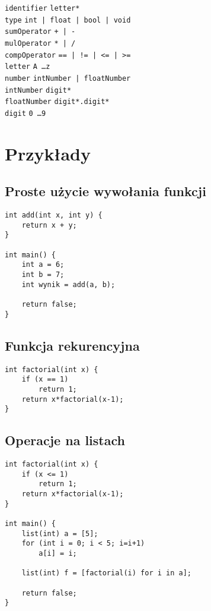 \documentclass{article}
\newcommand{\keyword}[1]{\colorbox{light-gray}{\texttt{#1}}}
\newcommand{\code}[1]{\texttt{#1}}
\begin{document}
\code{identifier} \textrightarrow \code{letter*} \\
\code{type} \textrightarrow \code{\keyword{int} | \keyword{float} | \keyword{bool} | \keyword{void}} \\
\code{sumOperator} \textrightarrow \code{\keyword{+} | \keyword{-}} \\
\code{mulOperator} \textrightarrow \code{\keyword{*} | \keyword{/}} \\
\code{compOperator} \textrightarrow \code{\keyword{==} | \keyword{!=} | \keyword{<=} | \keyword{>=}} \\
\code{letter} \textrightarrow \code{\keyword{A} \ldots \keyword{z}} \\
\code{number} \textrightarrow \code{intNumber | floatNumber} \\
\code{intNumber} \textrightarrow \code{digit*} \\
\code{floatNumber} \textrightarrow \code{digit*.digit*} \\
\code{digit} \textrightarrow \code{\keyword{0} \ldots \keyword{9}} \\

\newpage
\section{Przykłady}
\subsection{Proste użycie wywołania funkcji}
\begin{lstlisting}[tabsize=2]
int add(int x, int y) {
	return x + y;
}

int main() {
	int a = 6;
	int b = 7;
	int wynik = add(a, b);

	return false;
}
\end{lstlisting}

\subsection{Funkcja rekurencyjna}
\begin{lstlisting}[tabsize=2]
int factorial(int x) {
	if (x == 1)
		return 1;
	return x*factorial(x-1);
}
\end{lstlisting}

\subsection{Operacje na listach}
\begin{lstlisting}[tabsize=2]
int factorial(int x) {
	if (x <= 1)
		return 1;
	return x*factorial(x-1);
}

int main() {
	list(int) a = [5];
	for (int i = 0; i < 5; i=i+1)
		a[i] = i;

	list(int) f = [factorial(i) for i in a];

	return false;
}

\end{lstlisting}
\end{document}
